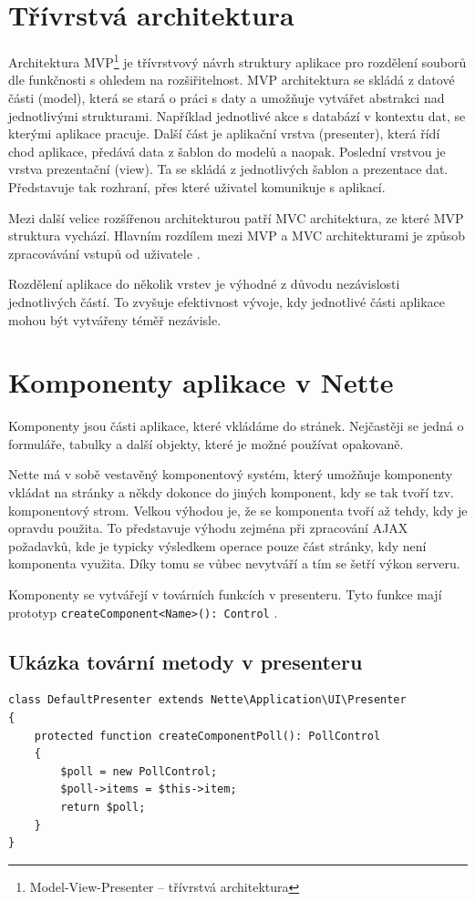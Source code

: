 \documentclass[czech,BP]{thesiskiv}
\begin{document}
		\section{Třívrstvá architektura}
		\par Architektura MVP\footnote{Model-View-Presenter -- třívrstvá architektura} je třívrstvový návrh struktury aplikace pro rozdělení souborů dle funkčnosti s ohledem na rozšiřitelnost. MVP architektura se skládá z datové části (model), která se stará o práci s daty a umožňuje vytvářet abstrakci nad jednotlivými strukturami. Například jednotlivé akce s databází v kontextu dat, se kterými aplikace pracuje. Další část je aplikační vrstva (presenter), která řídí chod aplikace, předává data z šablon do modelů a naopak. Poslední vrstvou je vrstva prezentační (view). Ta se skládá z jednotlivých šablon a prezentace dat. Představuje tak rozhraní, přes které uživatel komunikuje s aplikací.
		\par Mezi další velice rozšířenou architekturou patří MVC architektura, ze které MVP struktura vychází. Hlavním rozdílem mezi MVP a MVC architekturami je způsob zpracovávání vstupů od uživatele \cite{3Vrstvy}.
		\par Rozdělení aplikace do několik vrstev je výhodné z důvodu nezávislosti jednotlivých částí. To zvyšuje efektivnost vývoje, kdy jednotlivé části aplikace mohou být vytvářeny téměř nezávisle.
		
		\section{Komponenty aplikace v Nette}
		\par Komponenty jsou části aplikace, které vkládáme do stránek. Nejčastěji se jedná o formuláře, tabulky a další objekty, které je možné používat opakovaně.
		\par Nette má v sobě vestavěný komponentový systém, který umožňuje komponenty vkládat na stránky a někdy dokonce do jiných komponent, kdy se tak tvoří tzv. komponentový strom. Velkou výhodou je, že se komponenta tvoří až tehdy, kdy je opravdu použita. To představuje výhodu zejména při zpracování AJAX požadavků, kde je typicky výsledkem operace pouze část stránky, kdy není komponenta využita. Díky tomu se vůbec nevytváří a tím se šetří výkon serveru.
		\par Komponenty se vytvářejí v továrních funkcích v presenteru. Tyto funkce mají prototyp \texttt{createComponent<Name>(): Control} \cite{NetteComponents}.
		
		\subsection{Ukázka tovární metody v presenteru}
		\begin{lstlisting}[caption={Ukázka tovární metody v presenteru}]
class DefaultPresenter extends Nette\Application\UI\Presenter
{
	protected function createComponentPoll(): PollControl
	{
		$poll = new PollControl;
		$poll->items = $this->item;
		return $poll;
	}
}
\end{lstlisting}
		
\end{document}
